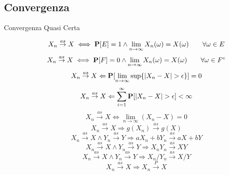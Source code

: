 \subsection{Convergenza}
\begin{description}
	
	\item[Convergenza Quasi Certa]
		\begin{equation}
		X_{n}\overset{as}{\rightarrow}X
		\iff
		\mathbf{P}[E]=1 \land \lim_{n\rightarrow\infty}X_{n}(\omega)=X(\omega)
		\qquad\forall\omega\in E
		\end{equation}
		\begin{equation}
		X_{n}\overset{as}{\rightarrow}X
		\iff
		\mathbf{P}[F]=0 \land \lim_{n\rightarrow\infty}X_{n}(\omega)=X(\omega)
		\qquad\forall\omega\in F^{c}
		\end{equation}
		\begin{equation}
		X_{n}\overset{as}{\rightarrow}X
		\Leftarrow
		\mathbf{P}[\lim_{n\rightarrow\infty} \sup \{|X_{n}-X| > \epsilon\}]=0
		\end{equation}
		\begin{equation}
		X_{n}\overset{as}{\rightarrow}X
		\Leftarrow
		\sum_{i=1}^{\infty}\mathbf{P}[|X_{n}-X| > \epsilon]<\infty
		\end{equation}
		\begin{equation}
		X_{n}\overset{as}{\rightarrow}X
		\iff
		\lim_{n\rightarrow\infty}(X_{n}-X)=0
		\end{equation}
		\begin{equation}
		X_{n}\overset{as}{\rightarrow}X
		\Rightarrow
		g(X_{n})\overset{as}{\rightarrow}g(X)
		\end{equation}
		\begin{equation}
		X_{n}\overset{as}{\rightarrow}X \land Y_{n}\overset{as}{\rightarrow}Y
		\Rightarrow
		aX_{n}+bY_{n}\overset{as}{\rightarrow}aX+bY
		\end{equation}
		\begin{equation}
		X_{n}\overset{as}{\rightarrow}X \land Y_{n}\overset{as}{\rightarrow}Y
		\Rightarrow
		X_{n}Y_{n}\overset{as}{\rightarrow}XY
		\end{equation}
		\begin{equation}
		X_{n}\overset{as}{\rightarrow}X \land Y_{n}\overset{as}{\rightarrow}Y
		\Rightarrow
		X_{n}/Y_{n}\overset{as}{\rightarrow}X/Y
		\end{equation}
		\begin{equation}
		X_{n}\overset{as}{\rightarrow}X \Rightarrow X_{n}\overset{P}{\rightarrow}X
		\end{equation}
		

\end{description}

